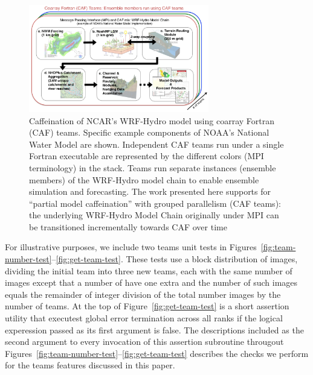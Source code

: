 \begin{figure}
\includegraphics[width=0.7\textwidth]{figures/WRF-Hydro-caf-ens-model_chain.png}
\vspace{-7pt}
\caption{Caffeination of NCAR's WRF-Hydro model using coarray Fortran (CAF)
  teams. Specific example components of  NOAA's National Water
  Model are shown. Independent CAF teams run under a single Fortran executable are represented by the different colors
  (MPI terminology) in the stack.  Teams run separate instances
  (ensemble members) of the WRF-Hydro model chain to enable ensemble
  simulation and forecasting. The work presented  here supports for ``partial model caffeination'' with grouped
  parallelism (CAF teams): the underlying WRF-Hydro Model Chain
  originally under MPI can be transitioned incrementally towards CAF
  over time\label{fig:caffeinate-wrf-hydro}}
\end{figure}
%

For illustrative purposes, we include two teams unit tests in
Figures~\ref{fig:team-number-test}--\ref{fig:get-team-test}. These tests use a block distribution of images,
dividing the initial team into three new teams, each with the same number of images except that a number of
have one extra and the number of such images equals the remainder of integer division of the total
number images by the number of teams. At the top of Figure~\ref{fig:get-team-test} is a short assertion
utility that executest global error termination across all ranks if the logical experession passed as its
first argument is false.  The descriptions included as the second argument to every invocation of this
assertion subroutine througout Figures~\ref{fig:team-number-test}--\ref{fig:get-team-test} describes the
checks we perform for the teams features discussed in this paper.

